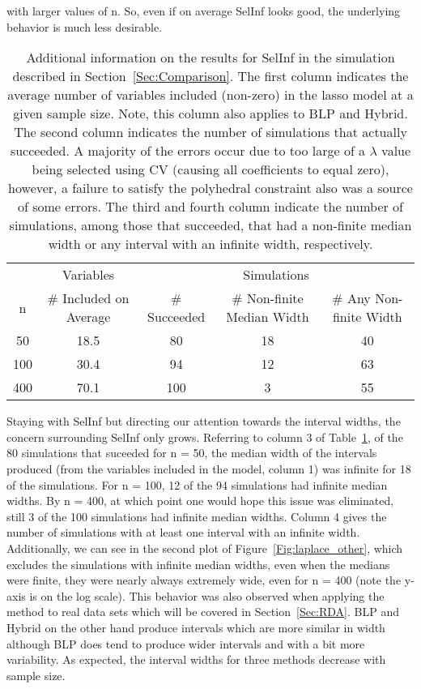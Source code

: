 with larger values of n. So, even if on average SelInf looks good, the underlying behavior is much less desirable.

\begin{table}[hb]
  \centering
  \begin{tabular}{ccccc}
  \hline
  & Variables & \multicolumn{3}{c}{Simulations} \\
  \cmidrule(lr){2-2}\cmidrule(lr){3-5}
  n & \# Included on Average & \# Succeeded & \# Non-finite Median Width & \# Any Non-finite Width \\
  \hline
  50 & 18.5 & 80 & 18 & 40 \\
  100 & 30.4 & 94 & 12 & 63 \\
  400 & 70.1 & 100 & 3 & 55 \\
  \hline
  \end{tabular}
  \caption{Additional information on the results for SelInf in the simulation described in Section~\ref{Sec:Comparison}. The first column indicates the average number of variables included (non-zero) in the lasso model at a given sample size. Note, this column also applies to BLP and Hybrid. The second column indicates the number of simulations that actually succeeded. A majority of the errors occur due to too large of a $\lambda$ value being selected using CV (causing all coefficients to equal zero), however, a failure to satisfy the polyhedral constraint also was a source of some errors. The third and fourth column indicate the number of simulations, among those that succeeded, that had a non-finite median width or any interval with an infinite width, respectively.}
  \label{Tab:selective_inference}
\end{table}

Staying with SelInf but directing our attention towards the interval widths, the concern surrounding SelInf only grows. Referring to column 3 of Table~\ref{Tab:selective_inference}, of the 80 simulations that suceeded for n = 50, the median width of the intervals produced (from the variables included in the model, column 1) was infinite for 18 of the simulations. For n = 100, 12 of the 94 simulations had infinite median widths. By n = 400, at which point one would hope this issue was eliminated, still 3 of the 100 simulations had infinite median widths. Column 4 gives the number of simulations with at least one interval with an infinite width. Additionally, we can see in the second plot of Figure~\ref{Fig:laplace_other}, which excludes the simulations with infinite median widths, even when the medians were finite, they were nearly always extremely wide, even for n = 400 (note the y-axis is on the log scale). This behavior was also observed when applying the method to real data sets which will be covered in Section~\ref{Sec:RDA}. BLP and Hybrid on the other hand produce intervals which are more similar in width although BLP does tend to produce wider intervals and with a bit more variability. As expected, the interval widths for three methods decrease with sample size.

